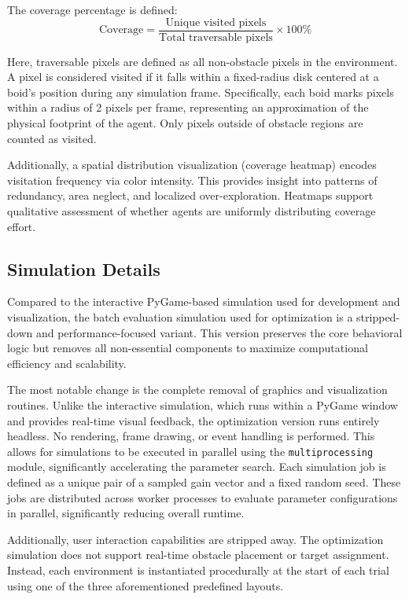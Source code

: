 \documentclass[12pt]{article}
\begin{document}
\begin{linenumbers}
The coverage percentage is defined:
\[\text{Coverage} = \frac{\text{Unique visited pixels}}{\text{Total traversable pixels}} \times 100\%\]

Here, traversable pixels are defined as all non-obstacle pixels in the environment. A pixel is considered visited if it falls within a fixed-radius disk centered at a boid's position during any simulation frame. Specifically, each boid marks pixels within a radius of 2 pixels per frame, representing an approximation of the physical footprint of the agent. Only pixels outside of obstacle regions are counted as visited.

Additionally, a spatial distribution visualization (coverage heatmap) encodes visitation frequency via color intensity. This provides insight into patterns of redundancy, area neglect, and localized over-exploration. Heatmaps support qualitative assessment of whether agents are uniformly distributing coverage effort.

\subsection{Simulation Details}

Compared to the interactive PyGame-based simulation used for development and visualization, the batch evaluation simulation used for optimization is a stripped-down and performance-focused variant. This version preserves the core behavioral logic but removes all non-essential components to maximize computational efficiency and scalability.

The most notable change is the complete removal of graphics and visualization routines. Unlike the interactive simulation, which runs within a PyGame window and provides real-time visual feedback, the optimization version runs entirely headless. No rendering, frame drawing, or event handling is performed. This allows for simulations to be executed in parallel using the \texttt{multiprocessing} module, significantly accelerating the parameter search. Each simulation job is defined as a unique pair of a sampled gain vector and a fixed random seed. These jobs are distributed across worker processes to evaluate parameter configurations in parallel, significantly reducing overall runtime.

Additionally, user interaction capabilities are stripped away. The optimization simulation does not support real-time obstacle placement or target assignment. Instead, each environment is instantiated procedurally at the start of each trial using one of the three aforementioned predefined layouts.


\end{linenumbers}
\end{document}
